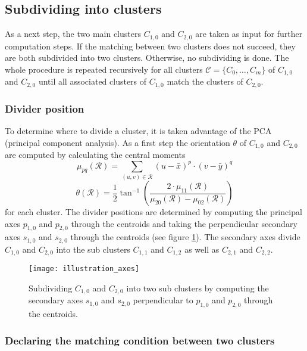 \subsection{Subdividing into clusters}

As a next step, the two main clusters $C_{1,0}$ and $C_{2,0}$ are taken as input for further computation steps. If the matching between two clusters does not succeed, they are both subdivided into two clusters. Otherwise, no subdividing is done. The whole procedure is repeated recursively for all clusters $\mathcal{C} = \{C_0, \ldots, C_m\}$ of $C_{1,0}$ and $C_{2,0}$ until all associated clusters of $C_{1,0}$ match the clusters of $C_{2,0}$.  

\subsubsection{Divider position}

To determine where to divide a cluster, it is taken advantage of the PCA (principal component analysis). As a first step the orientation $\theta$ of $C_{1,0}$ and $C_{2,0}$ are computed by calculating the central moments
\begin{equation}
	\mu_{pq}(\mathcal{R}) = \sum_{(u,v)\in\mathcal{R}} (u - \bar{x})^p \cdot (v - \bar{y})^q
\end{equation}
\begin{equation}
	\theta(\mathcal{R}) = \frac{1}{2} \tan^{-1} \left(\frac{2\cdot \mu_{11}(\mathcal{R})}{\mu_{20}(\mathcal{R}) - \mu_{02}(\mathcal{R})}\right)
\end{equation}
for each cluster.	
The divider positions are determined by computing the principal axes $p_{1,0}$ and $p_{2,0}$ through the centroids and taking the perpendicular secondary axes $s_{1,0}$ and $s_{2,0}$ through the centroids (see figure \ref{fig:dc_axes_2p}). The secondary axes divide $C_{1,0}$ and $C_{2,0}$ into the sub clusters $C_{1,1}$ and $C_{1,2}$ as well as $C_{2,1}$ and $C_{2,2}$.

\begin{figure}
	\centering
	\texttt{[image: illustration\_axes]}
	\caption{Subdividing $C_{1,0}$ and $C_{2,0}$ into two sub clusters by computing the secondary axes $s_{1,0}$ and $s_{2,0}$ perpendicular to $p_{1,0}$ and $p_{2,0}$ through the centroids.}
	\label{fig:dc_axes_2p}
\end{figure}

\subsubsection{Declaring the matching condition between two clusters}

